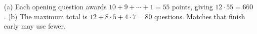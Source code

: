 (a) Each opening question awards $10+9+\cdots+1=55$ points, giving $\boxed{12\cdot55=660}$. (b) The maximum total is $12+8\cdot5+4\cdot7=\boxed{80}$ questions. Matches that finish early may use fewer.
